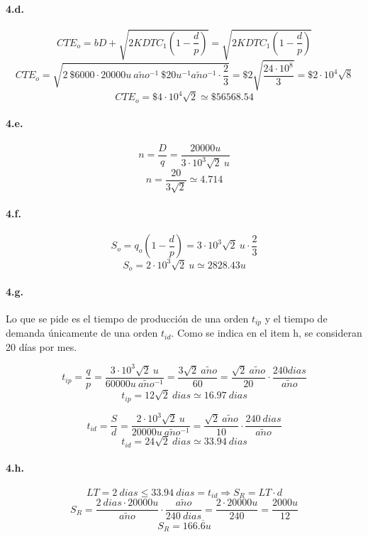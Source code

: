 \documentclass{article}
\def \anio {a\tilde{n}o}
\begin{document}
    \paragraph{4.d.}
        $$ CTE_o = bD + \sqrt{ 2KDTC_1 \left( 1 - \frac{d}{p} \right) } = \sqrt{ 2KDTC_1 \left( 1 - \frac{d}{p} \right) } $$
        $$ CTE_o = \sqrt{ 2\ \$6000 \cdot 20000u\ \anio^{-1}\ \$20u^{-1}\anio^{-1} \cdot \frac{2}{3} } = \$2 \sqrt{ \frac{24 \cdot 10^8}{3} } = \$2 \cdot 10^4 \sqrt{8} $$
        $$ \boxed{ CTE_o = \$4 \cdot 10^4 \sqrt{2} \simeq \$ 56568.54 } $$

    \paragraph{4.e.}
        $$ n = \frac{D}{q} = \frac{20000u}{3 \cdot 10^3 \sqrt{2}\ u} $$
        $$ \boxed{ n = \frac{20}{3 \sqrt{2}} \simeq 4.714 } $$
    
    \paragraph{4.f.}
        $$ S_o = q_o \left( 1 - \frac{d}{p} \right) = 3 \cdot 10^3 \sqrt {2}\ u \cdot \frac{2}{3} $$
        $$ \boxed{ S_o = 2 \cdot 10^3 \sqrt {2}\ u \simeq 2828.43 u } $$
    
    \paragraph{4.g.}
        Lo que se pide es el tiempo de producción de una orden $ t_{ip} $ y el tiempo de demanda únicamente de una orden $ t_{id} $. Como se indica en el item h, se consideran 20 días por mes.
        
        $$ t_{ip} = \frac{q}{p} = \frac{3 \cdot 10^3 \sqrt {2}\ u}{60000u\ \anio^{-1}} = \frac{3 \sqrt {2}\ \anio}{60} = \frac{\sqrt{2}\ \anio}{20} \cdot \frac{240dias}{\anio}$$
        $$ \boxed{ t_{ip} = 12\sqrt{2}\ dias \simeq 16.97\ dias } $$
        
        $$ t_{id} = \frac{S}{d} = \frac{2 \cdot 10^3 \sqrt {2}\ u}{20000u\ \anio^{-1}} = \frac{\sqrt{2}\ \anio}{10} \cdot \frac{240\ dias}{\anio} $$
        $$ \boxed{ t_{id} = 24\sqrt{2}\ dias \simeq 33.94\ dias } $$
    
    \paragraph{4.h.}
        $$ LT = 2\ dias \leq 33.94\ dias = t_{id} \Rightarrow S_R = LT \cdot d $$
        $$ S_R = \frac{2\ dias \cdot 20000u}{\anio} \cdot \frac{\anio}{240\ dias} = \frac{2 \cdot 20000u}{240} = \frac{2000u}{12} $$
        $$ \boxed{S_R = 166.\overline{6} u} $$
\end{document}
